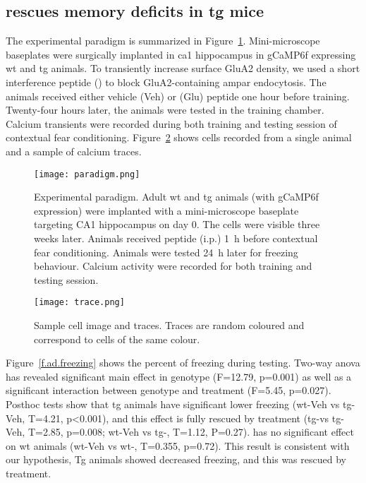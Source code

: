 \subsection{\tglu rescues memory deficits in \gls{tg} mice}
The experimental paradigm is summarized in Figure~\ref{f.ad.paradigm}. Mini-microscope baseplates were surgically implanted in \gls{ca1} hippocampus in gCaMP6f expressing \gls{wt} and \gls{tg} animals. To transiently increase surface GluA2 density, we used a short interference peptide (\tglu) to block GluA2-containing \gls{ampar} endocytosis. The animals received either vehicle (Veh) or \tglu{} (Glu) peptide one hour before training. Twenty-four hours later, the animals were tested in the training chamber. Calcium transients were recorded during both training and testing session of contextual fear conditioning. Figure~\ref{f.ad.trace} shows cells recorded from a single animal and a sample of calcium traces. 
\begin{figure}[h]
    \texttt{[image: paradigm.png]}
    \caption{Experimental paradigm. Adult \gls{wt} and \gls{tg} animals (with gCaMP6f expression) were implanted with a mini-microscope baseplate targeting CA1 hippocampus on day 0. The cells were visible three weeks later. Animals received \tglu peptide (i.p.) \SI{1}{\hour} before contextual fear conditioning. Animals were tested \SI{24}{\hour} later for freezing behaviour. Calcium activity were recorded for both training and testing session. \label{f.ad.paradigm}}
\end{figure}

\begin{figure}[h]
    \texttt{[image: trace.png]}
    \caption{Sample cell image and traces. Traces are random coloured and correspond to cells of the same colour. \label{f.ad.trace}}
\end{figure}

Figure~\ref{f.ad.freezing} shows the percent of freezing during testing. Two-way \gls{anova} has revealed significant main effect in genotype (F=12.79, p=0.001) as well as a significant interaction between genotype and treatment (F=5.45, p=0.027). Posthoc tests show that \gls{tg} animals have significant lower freezing (\gls{wt}-Veh vs \gls{tg}-Veh, T=4.21, p<0.001), and this effect is fully rescued by \tglu treatment (\gls{tg}-\tglu vs \gls{tg}-Veh, T=2.85, p=0.008; \gls{wt}-Veh vs \gls{tg}-\tglu, T=1.12, P=0.27). \tglu has no significant effect on \gls{wt} animals (\gls{wt}-Veh vs \gls{wt}-\tglu, T=0.355, p=0.72). This result is consistent with our hypothesis, Tg animals showed decreased freezing, and this was rescued by \tglu treatment. 

